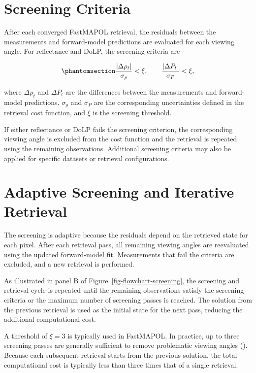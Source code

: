 \documentclass[
  11pt,
  letterpaper,
]{scrreprt}
\begin{document}
\section{Screening Criteria}\label{screening-criteria}

After each converged FastMAPOL retrieval, the residuals between the
measurements and forward-model predictions are evaluated for each
viewing angle. For reflectance and DoLP, the screening criteria are

\begin{equation}\phantomsection\label{eq-data-screening}{
\frac{|\Delta\rho_t|}{\sigma_\rho} < \xi,
\qquad
\frac{|\Delta P_t|}{\sigma_P} < \xi,
}\end{equation}

where \(\Delta\rho_t\) and \(\Delta P_t\) are the differences between
the measurements and forward-model predictions, \(\sigma_\rho\) and
\(\sigma_P\) are the corresponding uncertainties defined in the
retrieval cost function, and \(\xi\) is the screening threshold.

If either reflectance or DoLP fails the screening criterion, the
corresponding viewing angle is excluded from the cost function and the
retrieval is repeated using the remaining observations. Additional
screening criteria may also be applied for specific datasets or
retrieval configurations.

\section{Adaptive Screening and Iterative
Retrieval}\label{adaptive-screening-and-iterative-retrieval}

The screening is adaptive because the residuals depend on the retrieved
state for each pixel. After each retrieval pass, all remaining viewing
angles are reevaluated using the updated forward-model fit. Measurements
that fail the criteria are excluded, and a new retrieval is performed.

As illustrated in panel B of Figure~\ref{fig-flowchart-screening}, the
screening and retrieval cycle is repeated until the remaining
observations satisfy the screening criteria or the maximum number of
screening passes is reached. The solution from the previous retrieval is
used as the initial state for the next pass, reducing the additional
computational cost.

A threshold of \(\xi=3\) is typically used in FastMAPOL. In practice, up
to three screening passes are generally sufficient to remove problematic
viewing angles (). Because
each subsequent retrieval starts from the previous solution, the total
computational cost is typically less than three times that of a single
retrieval.
\end{document}
